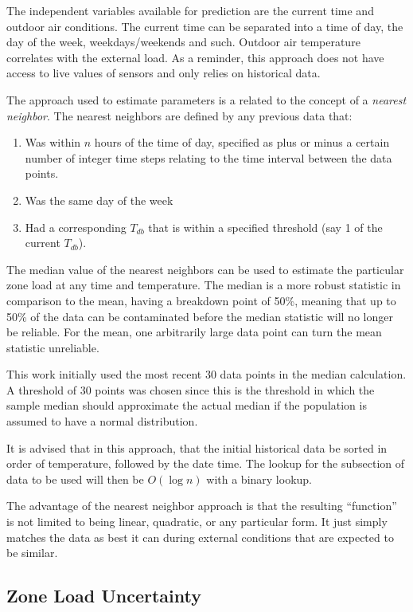 The independent variables available for prediction are the current time
and outdoor air conditions. The current time can be separated into a
time of day, the day of the week, weekdays/weekends and such. Outdoor air
temperature correlates with the external load. As a reminder, this
approach does not have access to live values of sensors and only relies
on historical data.

The approach used to estimate parameters is a related to the concept of
a \textit{nearest neighbor}. The nearest neighbors are defined by any
previous data that:

\begin{enumerate}
    \item Was within \(n\) hours of the time of day, specified as
        plus or minus a certain number of integer time steps relating to
        the time interval between the data points.
\item Was the same day of the week
\item Had a corresponding \(T_{db}\) that is within a specified
    threshold (say \SI{1}{\degreeF} of the current \(T_{db}\)).
\end{enumerate}

The median value of the nearest neighbors can be used to estimate the
particular zone load at any time and temperature.  The median is a more robust
statistic in comparison to the mean, having a breakdown point of 50\%, meaning
that up to 50\% of the data can be contaminated before the median statistic
will no longer be reliable. For the mean, one arbitrarily large data point can
turn the mean statistic unreliable.

This work initially used the most recent 30 data points in the median
calculation. A threshold of 30 points was chosen since this is the
threshold in which the sample median should approximate the actual
median if the population is assumed to have a normal distribution.

It is advised that in this approach, that the initial historical data be sorted
in order of temperature, followed by the date time.  The lookup for the
subsection of data to be used will then be \(O\left(\log n \right)\) with a
binary lookup.

The advantage of the nearest neighbor approach is that the resulting ``function''
is not limited to being linear, quadratic, or any particular form. It just
simply matches the data as best it can during external conditions that are
expected to be similar.

\subsection{Zone Load Uncertainty}

